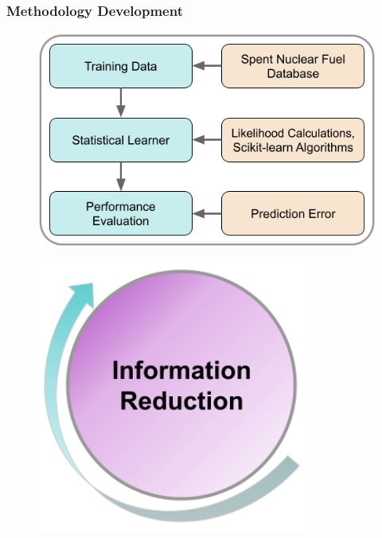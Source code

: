 \begin{frame}
  \frametitle{Methodology Development}
  \begin{minipage}{0.6\textwidth}
    \begin{figure}
      \centering
      \includegraphics[width=\textwidth]{./figures/meth_pres_intro.png}
    \end{figure}
  \end{minipage}%
  \hfill
  \begin{minipage}{0.4\textwidth}
    \begin{figure}
      \centering
      \includegraphics[width=0.8\textwidth]{./figures/info_reduc.png}
    \end{figure}
  \end{minipage}
\end{frame}


